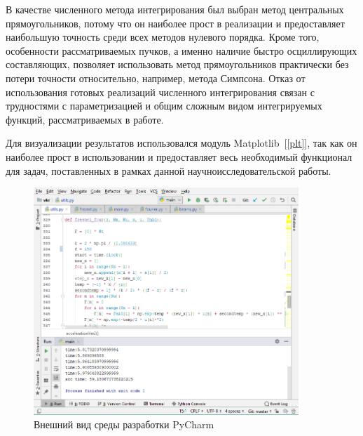 {    В качестве численного метода интегрирования был выбран метод
    центральных прямоугольников, потому что он наиболее прост в реализации и
    предоставляет наибольшую точность среди всех методов нулевого порядка.
    Кроме того, особенности рассматриваемых пучков, а именно наличие быстро осциллирующих составляющих,
    позволяет использовать метод прямоугольников практически без потери точности относительно, например, метода Симпсона.
    Отказ от использования готовых реализаций численного интегрирования связан
    с трудностями с параметризацией и общим сложным видом интегрируемых
    функций, рассматриваемых в работе.

    Для визуализации результатов использовался модуль Matplotlib~[\ref{plt}],
    так как он наиболее прост в использовании и предоставляет весь
    необходимый функционал для задач, поставленных в рамках данной научноисследовательской работы.

    \begin{figure}[H]
        \begin{center}
            \includegraphics[width=10cm]{plots/pycharm1}
            \vspace{0.4cm}
            \caption{Внешний вид среды разработки PyCharm}
            \label{pycharm}
        \end{center}
    \end{figure}

    \vspace{0.1cm}

}
